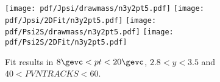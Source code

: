 \begin{figure}[H]
\begin{center}
\texttt{[image: pdf/Jpsi/drawmass/n3y2pt5.pdf]}
\texttt{[image: pdf/Jpsi/2DFit/n3y2pt5.pdf]}
\vspace*{-0.5cm}
\texttt{[image: pdf/Psi2S/drawmass/n3y2pt5.pdf]}
\texttt{[image: pdf/Psi2S/2DFit/n3y2pt5.pdf]}
\vspace*{-0.5cm}
\end{center}
\caption{Fit results in $8\gevc<pt<20\gevc$, $2.8<y<3.5$ and $40<PVNTRACKS<60$.}
\label{Fitn3y2pt5}
\end{figure}
